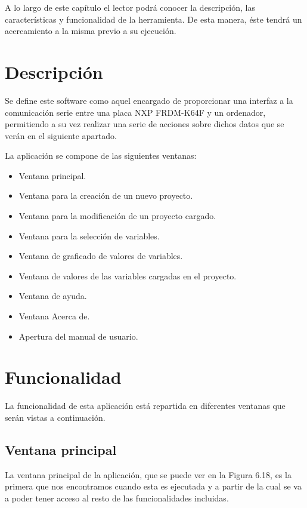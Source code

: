 
A lo largo de este capítulo el lector podrá conocer la descripción, las características y funcionalidad de la herramienta. De esta manera, éste tendrá un acercamiento a la misma previo a su ejecución.

\section{Descripción}

Se define este software como aquel encargado de proporcionar una interfaz a la comunicación serie entre una placa NXP FRDM-K64F y un ordenador, permitiendo a su vez realizar una serie de acciones sobre dichos datos que se verán en el siguiente apartado.

La aplicación se compone de las siguientes ventanas:
\begin{itemize}
	\item Ventana principal.
	\item Ventana para la creación de un nuevo proyecto.
	\item Ventana para la modificación de un proyecto cargado.
	\item Ventana para la selección de variables.
	\item Ventana de graficado de valores de variables.
	\item Ventana de valores de las variables cargadas en el proyecto.
	\item Ventana de ayuda.
	\item Ventana Acerca de.
	\item Apertura del manual de usuario.
\end{itemize}

\section{Funcionalidad}

La funcionalidad de esta aplicación está repartida en diferentes ventanas que serán vistas a continuación.

\subsection{Ventana principal}

La ventana principal de la aplicación, que se puede ver en la Figura 6.18, es la primera que nos encontramos cuando esta es ejecutada y a partir de la cual se va a poder tener acceso al resto de las funcionalidades incluidas.

